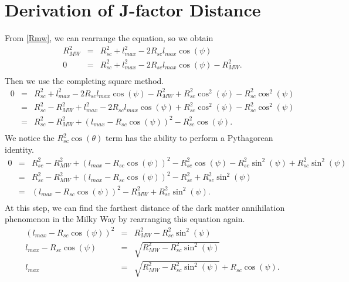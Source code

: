 \documentclass[10pt, oneside]{book}
\numberwithin{equation}{chapter}
\begin{document}
\chapter{Derivation of J-factor Distance}
From \autoref{Rmw}, we can rearrange the equation, so we obtain
\begin{eqnarray*}
    R_{MW}^2 &=& R^2_{sc} + l^2_{max} - 2R_{sc}l_{max}\cos\left(\psi\right)\\
    0 &=& R^2_{sc} + l^2_{max}-2R_{sc}l_{max}\cos\left(\psi\right) - R_{MW}^2.\\
\end{eqnarray*}
Then we use the completing square method.
\begin{eqnarray*}
    0 &=& R^2_{sc} + l^2_{max} - 2R_{sc}l_{max}\cos\left(\psi\right)-R_{MW}^2 + R_{sc}^2\cos^2(\psi) - R_{sc}^2\cos^2(\psi)\\
    &=& R^2_{sc} -R_{MW}^2 + l^2_{max} - 2R_{sc}l_{max}\cos\left(\psi\right) + R_{sc}^2\cos^2(\psi) - R_{sc}^2\cos^2(\psi)\\
    &=& R^2_{sc} - R_{MW}^2 + (l_{max} - R_{sc}\cos(\psi))^2 - R_{sc}^2\cos(\psi).\\
\end{eqnarray*}
We notice the $R_{sc}^2\cos(\theta)$ term has the ability to perform a Pythagorean identity.
\begin{eqnarray*}
   0 &=& R^2_{sc} - R_{MW}^2 + (l_{max} - R_{sc}\cos(\psi))^2 - R_{sc}^2\cos(\psi) - R_{sc}^2\sin^2(\psi) + R_{sc}^2\sin^2(\psi)\\
    &=& R^2_{sc} - R_{MW}^2 + (l_{max} - R_{sc}\cos(\psi))^2 - R_{sc}^2 + R_{sc}^2\sin^2(\psi)\\
    &=& (l_{max} - R_{sc}\cos(\psi))^2 - R_{MW}^2 + R_{sc}^2\sin^2(\psi).\\
\end{eqnarray*}
At this step, we can find the farthest distance of the dark matter annihilation phenomenon in the Milky Way by rearranging this equation again.
\begin{eqnarray*}
    (l_{max} - R_{sc}\cos(\psi))^2 &=& R_{MW}^2 - R_{sc}^2\sin^2(\psi)\\
    l_{max} - R_{sc}\cos(\psi) &=& \sqrt{R_{MW}^2 - R_{sc}^2\sin^2(\psi)}\\
    l_{max} &=& \sqrt{R_{MW}^2-R_{sc}^2\sin^2(\psi)}+R_{sc}\cos(\psi).
\end{eqnarray*}

\end{document}
